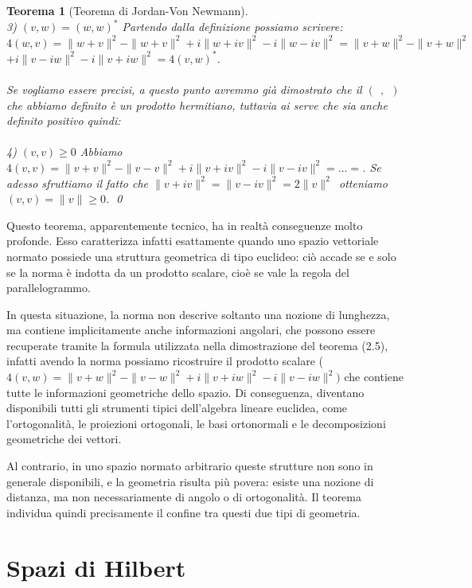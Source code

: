 \documentclass[a4paper,12pt]{report}
\newtheorem{teorema}{Teorema}[chapter]
\begin{document}
\begin{teorema}[Teorema di Jordan-Von Newmann]
    \\ 3) $\boxed{(v,w)=(w,w)^*}$ Partendo dalla definizione possiamo scrivere:
    \\ \mbox{$4(w,v)=\|w+v\|^2-\|w+v\|^2+i\|w+iv\|^2-i\|w-iv\|^2=\|v+w\|^2-\|v+w\|^2$} 
    \\$+i\|v-iw\|^2-i\|v+iw\|^2=4(v,w)^*$.
    \\
    \\Se vogliamo essere precisi, a questo punto avremmo già dimostrato che il $( \ \ , \ \ )$ che abbiamo definito è un prodotto hermitiano, tuttavia ai serve che sia anche definito positivo quindi:
    \\
    \\ 4) $\boxed{(v,v)\geq0}$ Abbiamo $4(v,v)=\|v+v\|^2-\|v-v\|^2+i\|v+iv\|^2-i\|v-iv\|^2=...=$. Se adesso sfruttiamo il fatto che \mbox{$\|v+iv\|^2=\|v-iv\|^2=2\|v\|^2$ otteniamo $(v,v)=\|v\| \geq 0$}. \qed
    
\end{teorema}

Questo teorema, apparentemente tecnico, ha in realtà conseguenze molto profonde. Esso caratterizza infatti esattamente quando uno spazio vettoriale normato possiede una struttura geometrica di tipo euclideo: ciò accade se e solo se la norma è indotta da un prodotto scalare, cioè se vale la regola del parallelogrammo.

In questa situazione, la norma non descrive soltanto una nozione di lunghezza, ma contiene implicitamente anche informazioni angolari, che possono essere recuperate tramite la formula utilizzata nella dimostrazione del teorema (2.5), infatti avendo la norma possiamo ricostruire il prodotto scalare ($4(v,w)=\|v+w\|^2-\|v-w\|^2+i\|v+iw\|^2-i\|v-iw\|^2)$ che contiene tutte le informazioni geometriche dello spazio. Di conseguenza, diventano disponibili tutti gli strumenti tipici dell’algebra lineare euclidea, come l’ortogonalità, le proiezioni ortogonali, le basi ortonormali e le decomposizioni geometriche dei vettori.

Al contrario, in uno spazio normato arbitrario queste strutture non sono in generale disponibili, e la geometria risulta più povera: esiste una nozione di distanza, ma non necessariamente di angolo o di ortogonalità. Il teorema individua quindi precisamente il confine tra questi due tipi di geometria.


\vspace{1.5cm}

\section{Spazi di Hilbert}\label{sec: 2.2}
\end{document}
